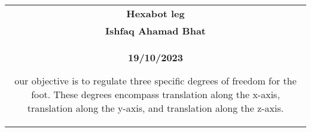 \documentclass{article}
\begin{document}
\begin{center}
  \begin{tabular}{c}
   \textbf{Hexabot leg}\\
   \textbf{Ishfaq Ahamad Bhat} \\
   \textbf{19/10/2023}
   
\newpage  %
    
   
our objective is to regulate three specific degrees of freedom for the foot. These degrees encompass translation along the x-axis, translation along the y-axis, and translation along the z-axis.
 \end{tabular}
\end{center}
\end{document}
